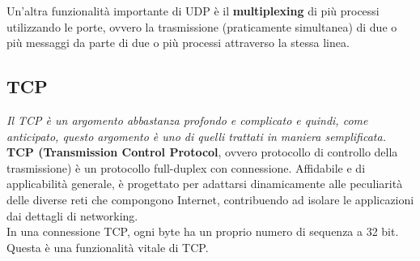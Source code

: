 \documentclass{article}
\begin{document}
        Un’altra funzionalità importante di UDP è il \textbf{multiplexing} di più processi utilizzando le porte,
        ovvero la trasmissione (praticamente simultanea) di due o più messaggi da parte di due o più
        processi attraverso la stessa linea.
        
        \subsection{TCP}
        \textit{Il TCP è un argomento abbastanza profondo e complicato e quindi, come anticipato, questo
        argomento è uno di quelli trattati in maniera semplificata.}\\

        \textbf{TCP (Transmission Control Protocol}, ovvero protocollo di controllo della trasmissione) è un
        protocollo full-duplex con connessione. Affidabile e di applicabilità generale, è progettato per
        adattarsi dinamicamente alle peculiarità delle diverse reti che compongono Internet,
        contribuendo ad isolare le applicazioni dai dettagli di networking.\\
        
        In una connessione TCP, ogni byte ha un proprio numero di sequenza a 32 bit. Questa è una
        funzionalità vitale di TCP.\\
        
\end{document}
